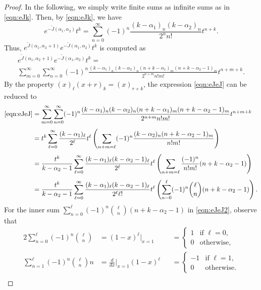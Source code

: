 \documentclass[10pt,a4paper]{amsart}
\begin{document}
\begin{proof}
In the following, we simply write finite sums as infinite sums as in \eqref{eqn:eJk}.
Then, by \eqref{eqn:eJk}, we have 
\begin{equation*}
e^{-\tilde{J}(\alpha_1, \alpha_2)}t^k
= \sum_{n=0}^{\infty}(-1)^n\frac{(k-\alpha_1)_n(k-\alpha_2)_n}{2^nn!}t^{n+k}.
\end{equation*}
Thus, $e^{\tilde{J}(\alpha_1,\alpha_2+1)}e^{-\tilde{J}(\alpha_1,\alpha_2)}t^k$ 
is computed as
\begin{multline}
e^{\tilde{J}(\alpha_1,\alpha_2+1)}e^{-\tilde{J}(\alpha_1,\alpha_2)}t^k
=\\
\sum_{m=0}^{\infty}\sum_{n=0}^{\infty}
(-1)^n\frac{(k-\alpha_1)_n(k-\alpha_2)_n(n+k-\alpha_1)_m(n+k-\alpha_2-1)_m}{2^{n+m}n!m!} t^{n+m+k}. \label{eqn:eJeJ}
\end{multline}
By the property $(x)_\ell(x+r)_k = (x)_{r+k}$,
the expression \eqref{eqn:eJeJ} can be reduced to
\begin{align}
\eqref{eqn:eJeJ}
&=\sum_{m=0}^{\infty}\sum_{n=0}^{\infty}
(-1)^n\frac{(k-\alpha_1)_n(k-\alpha_2)_n(n+k-\alpha_1)_m(n+k-\alpha_2-1)_m}{2^{n+m}n!m!} t^{n+m+k} \nonumber \\[3pt]
&=t^k \sum_{\ell=0}^\infty \frac{(k-\alpha_1)_\ell}{2^\ell}t^\ell
\left(\sum_{n+m=\ell} (-1)^n\frac{(k-\alpha_2)_n(n+k-\alpha_2-1)_m}{n!m!}\right)\nonumber\\[3pt]
&=\frac{t^k}{k-\alpha_2-1}
 \sum_{\ell=0}^\infty \frac{(k-\alpha_1)_\ell(k-\alpha_2-1)_\ell}{2^\ell}t^\ell
\left(\sum_{n+m=\ell} \frac{(-1)^n}{n!m!}(n+k-\alpha_2-1)\right)\nonumber\\[3pt]
&=\frac{t^k}{k-\alpha_2-1}
 \sum_{\ell=0}^\infty \frac{(k-\alpha_1)_\ell(k-\alpha_2-1)_\ell}{2^\ell \ell!}t^\ell
\left(\sum_{n=0}^\ell(-1)^n\binom{\ell}{n}(n+k-\alpha_2-1)\right).\label{eqn:eJeJ2}
\end{align}
For the inner sum $\sum_{n=0}^\ell(-1)^n\binom{\ell}{n}(n+k-\alpha_2-1)$ 
in \eqref{eqn:eJeJ2}, observe that 
\begin{alignat*}{2}
\sum_{n=0}^\ell(-1)^n\binom{\ell}{n}
&= (1-x)^\ell\big\vert_{x=1} 
&&= 
\begin{cases}
1 & \text{if $\ell = 0$},\\
0 & \text{otherwise},
\end{cases}\\[5pt]
\sum_{n=1}^\ell(-1)^n\binom{\ell}{n}n
&= \frac{d}{dx}\bigg\vert_{x=1}(1-x)^\ell 
&&= 
\begin{cases}
-1 & \text{if $\ell = 1$},\\
0 & \text{otherwise}.
\end{cases}\\[3pt]

\end{alignat*}
\end{proof}
\end{document}
